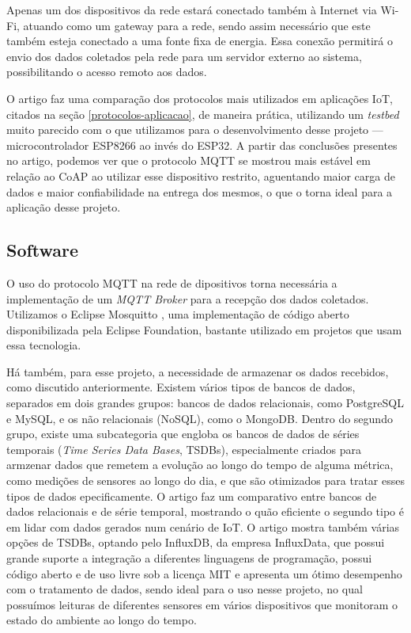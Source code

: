 \documentclass[../monografia.tex]{subfiles}
\begin{document}
Apenas um dos dispositivos da rede estará conectado também à Internet via Wi-Fi, atuando como um gateway para a rede, sendo assim necessário que este também esteja conectado a uma fonte fixa de energia. Essa conexão permitirá o envio dos dados coletados pela rede para um servidor externo ao sistema, possibilitando o acesso remoto aos dados.

O artigo \cite{analise-protocolos-iot} faz uma comparação dos protocolos mais utilizados em aplicações IoT, citados na seção \ref{protocolos-aplicacao}, de maneira prática, utilizando um \textit{testbed} muito parecido com o que utilizamos para o desenvolvimento desse projeto --- microcontrolador ESP8266 ao invés do ESP32. A partir das conclusões presentes no artigo, podemos ver que o protocolo MQTT se mostrou mais estável em relação ao CoAP ao utilizar esse dispositivo restrito, aguentando maior carga de dados e maior confiabilidade na entrega dos mesmos, o que o torna ideal para a aplicação desse projeto.


\subsection{Software}

O uso do protocolo MQTT na rede de dipositivos torna necessária a implementação de um \textit{MQTT Broker} para a recepção dos dados coletados. Utilizamos o Eclipse Mosquitto \cite{mosquitto}, uma implementação de código aberto disponibilizada pela Eclipse Foundation, bastante utilizado em projetos que usam essa tecnologia.

Há também, para esse projeto, a necessidade de armazenar os dados recebidos, como discutido anteriormente. Existem vários tipos de bancos de dados, separados em dois grandes grupos: bancos de dados relacionais, como PostgreSQL e MySQL, e os não relacionais (NoSQL), como o MongoDB. Dentro do segundo grupo, existe uma subcategoria que engloba os bancos de dados de séries temporais (\textit{Time Series Data Bases}, TSDBs), especialmente criados para armzenar dados que remetem a evolução ao longo do tempo de alguma métrica, como medições de sensores ao longo do dia, e que são otimizados para tratar esses tipos de dados epecificamente. O artigo \cite{timeseries-databases} faz um comparativo entre bancos de dados relacionais e de série temporal, mostrando o quão eficiente o segundo tipo é em lidar com dados gerados num cenário de IoT. O artigo mostra também várias opções de TSDBs, optando pelo InfluxDB, da empresa InfluxData, que possui grande suporte a integração a diferentes linguagens de programação, possui código aberto e de uso livre sob a licença MIT e apresenta um ótimo desempenho com o tratamento de dados, sendo ideal para o uso nesse projeto, no qual possuímos leituras de diferentes sensores em vários dispositivos que monitoram o estado do ambiente ao longo do tempo.
\end{document}
